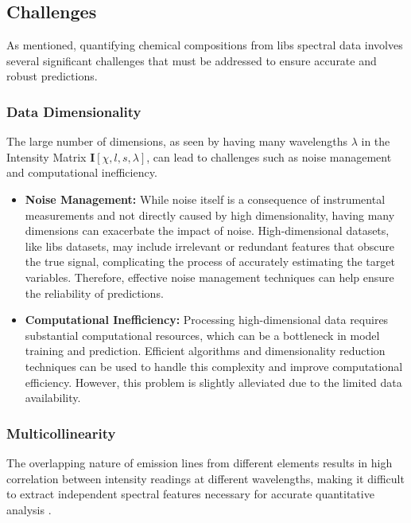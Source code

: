 \subsection{Challenges}
As mentioned, quantifying chemical compositions from \gls{libs} spectral data involves several significant challenges that must be addressed to ensure accurate and robust predictions.

\subsubsection{Data Dimensionality}
The large number of dimensions, as seen by having many wavelengths $\lambda$ in the Intensity Matrix $\mathbf{I}[\chi, l, s, \lambda]$, can lead to challenges such as noise management and computational inefficiency.
\begin{itemize}
    \item \textbf{Noise Management:} While noise itself is a consequence of instrumental measurements\cite{wiensPreflightCalibrationInitial2013} and not directly caused by high dimensionality, having many dimensions can exacerbate the impact of noise. High-dimensional datasets, like \gls{libs} datasets, may include irrelevant or redundant features that obscure the true signal, complicating the process of accurately estimating the target variables. Therefore, effective noise management techniques can help ensure the reliability of predictions.
    
    \item \textbf{Computational Inefficiency:} Processing high-dimensional data requires substantial computational resources, which can be a bottleneck in model training and prediction. Efficient algorithms and dimensionality reduction techniques can be used to handle this complexity and improve computational efficiency. However, this problem is slightly alleviated due to the limited data availability.
\end{itemize}

\subsubsection{Multicollinearity}
The overlapping nature of emission lines from different elements results in high correlation between intensity readings at different wavelengths, making it difficult to extract independent spectral features necessary for accurate quantitative analysis \cite{andersonImprovedAccuracyQuantitative2017}.

